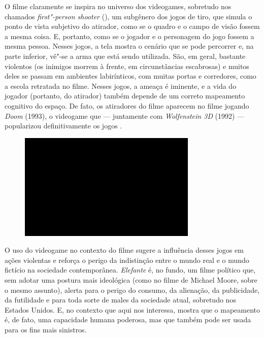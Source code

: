 O filme claramente se inspira no universo dos videogames,
sobretudo nos chamados \emph{first"-person shooter} (), um subgênero
dos jogos de tiro, que simula o ponto de vista subjetivo do atirador,
como se o quadro e o campo de visão fossem a mesma coisa. E, portanto,
como se o jogador e o personagem do jogo fossem a mesma pessoa. Nesses
jogos, a tela mostra o cenário que se pode percorrer e, na parte
inferior, vê"-se a arma que está sendo utilizada. São, em geral, bastante
violentos (os inimigos morrem à frente, em circunstâncias escabrosas) e
muitos deles se passam em ambientes labirínticos, com muitas portas e
corredores, como a escola retratada no filme. Nesses jogos, a ameaça é
iminente, e a vida do jogador (portanto, do atirador) também depende de
um correto mapeamento cognitivo do espaço. De fato, os atiradores do
filme aparecem no filme jogando \emph{Doom} (1993), o videogame que ---
juntamente com \emph{Wolfenstein 3D} (1992) --- popularizou
definitivamente os jogos .

\begin{figure}[!ht]

\centering
 \includegraphics[width=85mm]{./imgs/im1.jpg}
\caption{\tiny{}}

\end{figure}


O uso do videogame no contexto do filme sugere a influência
desses jogos em ações violentas e reforça o perigo da indistinção entre
o mundo real e o mundo fictício na sociedade contemporânea.
\emph{Elefante} é, no fundo, um filme político que, sem adotar uma
postura mais ideológica (como no filme de Michael Moore, sobre o mesmo
assunto), alerta para o perigo do consumo, da alienação, da publicidade,
da futilidade e para toda sorte de males da sociedade atual, sobretudo
nos Estados Unidos. E, no contexto que aqui nos interessa, mostra que o
mapeamento é, de fato, uma capacidade humana poderosa, mas que também
pode ser usada para os fins mais sinistros.


